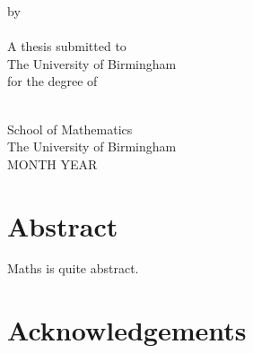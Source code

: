 \documentclass[a4paper, 12pt, oneside]{report}
\theoremstyle{nonumberplain}
\begin{document}
\doublespacing





\begin{titlepage}

	\vspace*{0.1in}
	\begin{singlespace}
		\begin{center}
			\begin{doublespace}
			{\LARGE{}}
			\end{doublespace}
			\vspace{0.5in}
			by\\
			\vspace{0.5in}
			{\Large{}}\\
			\vspace{1.5in}
			A thesis submitted to\\
			The University of Birmingham\\
			for the degree of\\
			{}\\
		\end{center}

		\vfill

		\hfill
		\parbox{2.8in}{School of Mathematics\\
			The University of Birmingham\\
			MONTH YEAR}
	\end{singlespace}

\end{titlepage}



\chapter*{Abstract}

Maths is quite abstract.

\thispagestyle{empty}



\chapter*{Acknowledgements}
\end{document}
